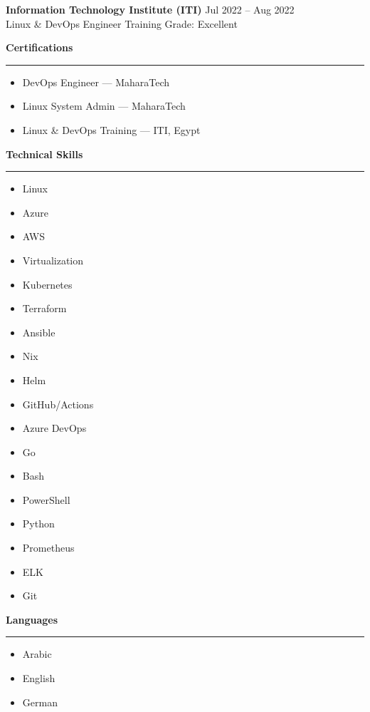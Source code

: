 \documentclass[11pt]{article}
\newcommand{\cvsection}[1]{%
  \vspace{6pt}%
  {\large\bfseries\textcolor{accent}{#1}}\\[-4pt]%
  \textcolor{accent}{\rule{\linewidth}{0.6pt}}%
  \vspace{6pt}%
}
\begin{document}
\vspace{6pt}

\textbf{Information Technology Institute (ITI)} \hfill Jul 2022 -- Aug 2022\\
Linux \& DevOps Engineer Training \hfill Grade: Excellent


\cvsection{Certifications}
\begin{multicols}{2}
	\begin{itemize}[left=0pt, label={}]
		\item DevOps Engineer — MaharaTech
		\item Linux System Admin — MaharaTech
		\item Linux \& DevOps Training — ITI, Egypt
	\end{itemize}
\end{multicols}

\cvsection{Technical Skills}
\begin{multicols}{3}
	\begin{itemize}[left=0pt, label={}]
		\item Linux
		\item Azure
		\item AWS
		\item Virtualization
		\item Kubernetes
		\item Terraform
		\item Ansible
		\item Nix
		\item Helm
		\item GitHub/Actions
		\item Azure DevOps
		\item Go
		\item Bash
		\item PowerShell
		\item Python
		\item Prometheus
		\item ELK
		\item Git
	\end{itemize}
\end{multicols}

\cvsection{Languages}
\begin{multicols}{3}
	\begin{itemize}[left=0pt, label={}]
		\item Arabic
		\item English
		\item German
	\end{itemize}
\end{multicols}

\printbibliography[heading=none]
\end{document}
